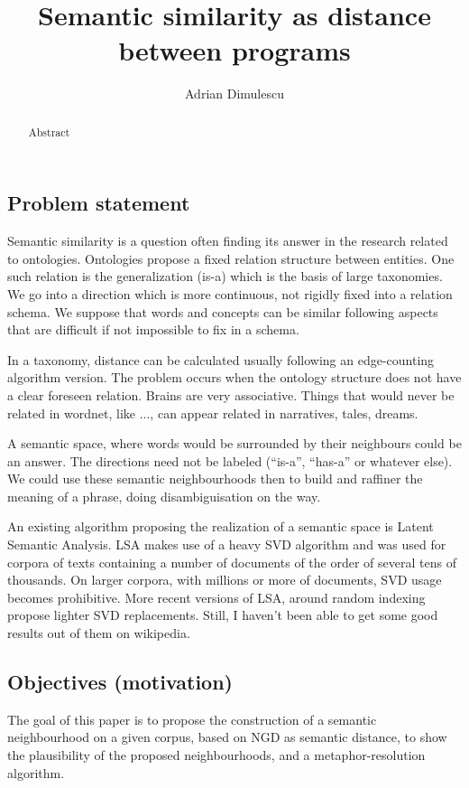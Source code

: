 \documentclass[a4paper,10pt]{article}
\title{Semantic similarity as distance between programs}
\author{Adrian Dimulescu}
\begin{document}
\maketitle

\begin{abstract}
Abstract
\end{abstract}

\subsection*{Problem statement}

Semantic similarity is a question often finding its answer in the research related to ontologies. Ontologies propose a
fixed relation structure between entities. One such relation is the generalization (is-a) which is the basis of large
taxonomies. We go into a direction which is more continuous, not rigidly fixed into a relation schema. We suppose that
words and concepts can be similar following aspects that are difficult if not impossible to fix in a schema. 

In a taxonomy, distance can be calculated usually following an edge-counting algorithm version. The problem occurs when
the ontology structure does not have a clear foreseen relation. Brains are very associative. Things that would never be
related in wordnet, like ..., can appear related in narratives, tales, dreams.

A semantic space, where words would be surrounded by their neighbours could be an answer. The directions need not be
labeled (``is-a'', ``has-a'' or whatever else). We could use these semantic neighbourhoods then to build and raffiner
the meaning of a phrase, doing disambiguisation on the way.

An existing algorithm proposing the realization of a semantic space is Latent Semantic Analysis. LSA makes use of a
heavy SVD algorithm and was used for corpora of texts containing a number of documents of the order of several tens of
thousands. On larger corpora, with millions or more of documents, SVD usage becomes prohibitive. More recent versions
of LSA, around random indexing propose lighter SVD replacements. Still, I haven't been able to get some good results
out of them on wikipedia.

\subsection*{Objectives (motivation)}

The goal of this paper is to propose the construction of a semantic neighbourhood on a given corpus, based on NGD as
semantic distance, to show the plausibility of the proposed neighbourhoods, and a metaphor-resolution algorithm.
\end{document}
